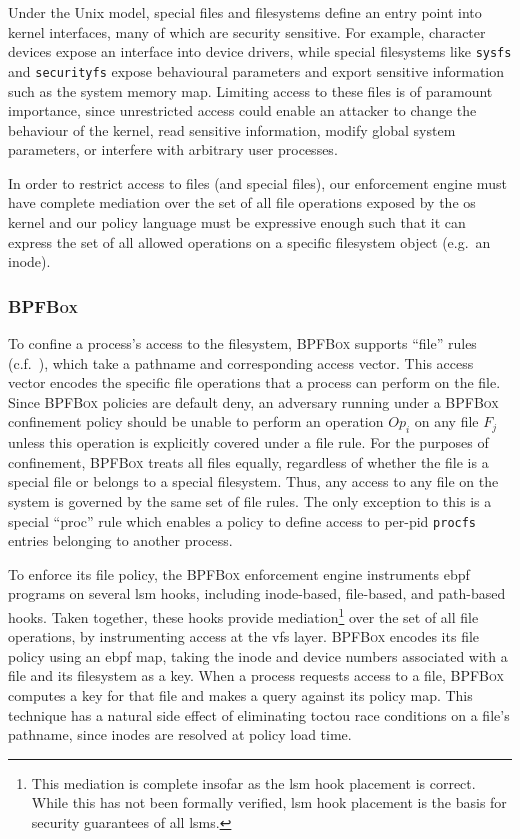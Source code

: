 \documentclass[
  fontsize=12pt,
  titlepage=firstiscover,
  paper=letter,
oneside,
  cleardoublepage=plain,
  parskip=half-,
  DIV=10,
  parindent,
  appendixprefix,
  chapterprefix,
  listof=totoc,
]{scrbook}
\newcommand{\bpfbox}{\textsc{BPFBox}}
\begin{document}
Under the Unix model, special files and filesystems define an entry point into kernel
interfaces, many of which are security sensitive. For example, character devices expose an
interface into device drivers, while special filesystems like \texttt{sysfs} and
\texttt{securityfs} expose behavioural parameters and export sensitive information such as
the system memory map. Limiting access to these files is of paramount importance, since
unrestricted access could enable an attacker to change the behaviour of the kernel, read
sensitive information, modify global system parameters, or interfere with arbitrary user
processes.

In order to restrict access to files (and special files), our enforcement engine must have
complete mediation over the set of all file operations exposed by the \gls{os} kernel and
our policy language must be expressive enough such that it can express the set of all
allowed operations on a specific filesystem object (e.g.\ an inode).

\subsubsection{\bpfbox{}}

To confine a process's access to the filesystem, \bpfbox{} supports \enquote{file} rules
(c.f.\ ), which take a pathname and corresponding access
vector. This access vector encodes the specific file operations that a process can perform
on the file. Since \bpfbox{} policies are default deny, an adversary running under
a \bpfbox{} confinement policy should be unable to perform an operation $Op_i$ on any file
$F_j$ unless this operation is explicitly covered under a file rule. For the purposes of
confinement, \bpfbox{} treats all files equally, regardless of whether the file is
a special file or belongs to a special filesystem. Thus, any access to any file on the
system is governed by the same set of file rules. The only exception to this is a special
\enquote{proc} rule which enables a policy to define access to per-pid \texttt{procfs}
entries belonging to another process.

To enforce its file policy, the \bpfbox{} enforcement engine instruments \gls{ebpf}
programs on several \gls{lsm} hooks, including inode-based, file-based, and path-based
hooks. Taken together, these hooks provide mediation\footnote{This mediation is complete
insofar as the \gls{lsm} hook placement is correct. While this has not been formally
verified, \gls{lsm} hook placement is the basis for security guarantees of all
\glspl{lsm}.} over the set of all file operations, by instrumenting access at the
\gls{vfs} layer. \bpfbox{} encodes its file policy using an \gls{ebpf} map, taking the
inode and device numbers associated with a file and its filesystem as a key. When
a process requests access to a file, \bpfbox{} computes a key for that file and makes
a query against its policy map. This technique has a natural side effect of eliminating
\gls{toctou} race conditions on a file's pathname, since inodes are resolved at policy
load time.
\end{document}
